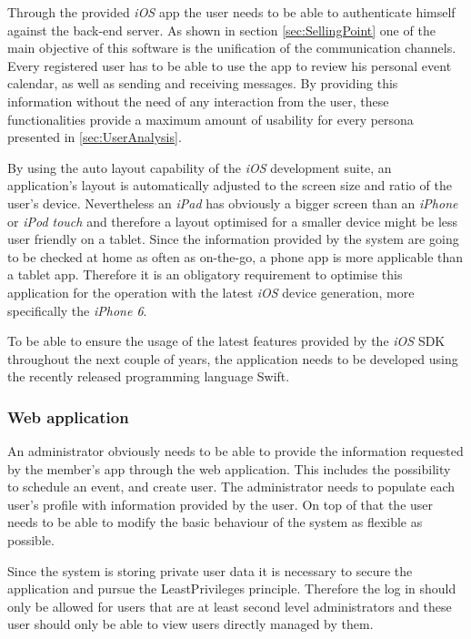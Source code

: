 Through the provided \emph{iOS} app the user needs to be able to authenticate himself against the back-end server. As shown in section \vref{sec:SellingPoint} one of the main objective of this software is the unification of the communication channels. Every registered user has to be able to use the app to review his personal event calendar, as well as sending and receiving messages. By providing this information without the need of any interaction from the user, these functionalities provide a maximum amount of usability for every persona presented in \vref{sec:UserAnalysis}. 

By using the auto layout capability of the \emph{iOS} development suite, an application's layout is automatically adjusted to the screen size and ratio of the user's device. Nevertheless an \emph{iPad} has obviously a bigger screen than an \emph{iPhone} or \emph{iPod touch} and therefore a layout optimised for a smaller device might be less user friendly on a tablet. Since the information provided by the system are going to be checked at home as often as on-the-go, a phone app is more applicable than a tablet app. Therefore it is an obligatory requirement to optimise this application for the operation with the latest \emph{iOS} device generation, more specifically the \emph{iPhone 6}.

To be able to ensure the usage of the latest features provided by the \emph{iOS} \gls{SDK} throughout the next couple of years, the application needs to be developed using the recently released programming language \gls{Swift}.

\subsubsection{Web application}

An administrator obviously needs to be able to provide the information requested by the member's app through the web application. This includes the possibility to schedule an event, and create user. The administrator needs to populate each user's profile with information provided by the user. On top of that the user needs to be able to modify the basic behaviour of the system as flexible as possible.

Since the system is storing private user data it is necessary to secure the application and pursue the \gls{LeastPrivileges} principle. Therefore the log in should only be allowed for users that are at least second level administrators and these user should only be able to view users directly managed by them.

